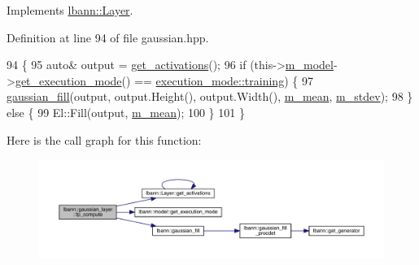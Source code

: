 Implements \hyperlink{classlbann_1_1Layer_a523319dd1bd87a0612afa1912bb5aad7}{lbann\+::\+Layer}.



Definition at line 94 of file gaussian.\+hpp.


\begin{DoxyCode}
94                              \{
95     \textcolor{keyword}{auto}& output = \hyperlink{classlbann_1_1Layer_a1134b1a4385af199d7272c5aa827fa99}{get\_activations}();
96     \textcolor{keywordflow}{if} (this->\hyperlink{classlbann_1_1Layer_a3d9315e99574166f2f33e37b572021d2}{m\_model}->\hyperlink{classlbann_1_1model_addb40597cf29aa6d31b6a7d09ef48608}{get\_execution\_mode}() == 
      \hyperlink{base_8hpp_a2781a159088df64ed7d47cc91c4dc0a8ac185ddac8b5a8f5aa23c5b80bc12d214}{execution\_mode::training}) \{
97       \hyperlink{namespacelbann_abd116f95f55d0e29d9a0cc386139c4b4}{gaussian\_fill}(output, output.Height(), output.Width(), \hyperlink{classlbann_1_1gaussian__layer_a397a47df5968e58fd1fcbfcdc2a3a620}{m\_mean}, 
      \hyperlink{classlbann_1_1gaussian__layer_a42dc22c72a46ed4538b7776e24eb0a40}{m\_stdev});
98     \} \textcolor{keywordflow}{else} \{
99       El::Fill(output, \hyperlink{classlbann_1_1gaussian__layer_a397a47df5968e58fd1fcbfcdc2a3a620}{m\_mean});
100     \}
101   \}
\end{DoxyCode}
Here is the call graph for this function\+:\nopagebreak
\begin{figure}[H]
\begin{center}
\leavevmode
\includegraphics[width=350pt]{classlbann_1_1gaussian__layer_a8a0f52d4f365180dbf11e9a09b359c5e_cgraph}
\end{center}
\end{figure}
\mbox{\label{classlbann_1_1gaussian__layer_a79dce69c1a681b66849423329f84df30}} 
